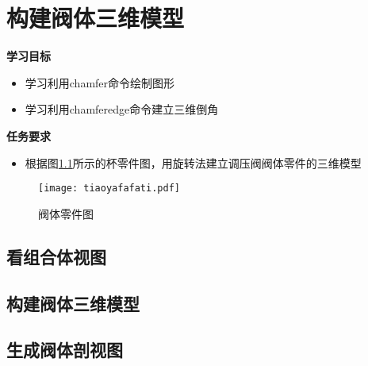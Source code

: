 \chapter{构建阀体三维模型}

{\bfseries 学习目标}
\begin{itemize}
\item 学习利用chamfer命令绘制图形
\item 学习利用chamferedge命令建立三维倒角
\end{itemize}

{\bfseries 任务要求}
\begin{itemize}
\item 根据图\ref{fig:tiaoyafafati}所示的杯零件图，用旋转法建立调压阀阀体零件的三维模型
\end{itemize}

\noindent
\begin{figure}[htbp]
\centering
\texttt{[image: tiaoyafafati.pdf]}
\caption{阀体零件图}\label{fig:tiaoyafafati}
\end{figure}
\clearpage
\section{看组合体视图}


%
\section{构建阀体三维模型}


\section{生成阀体剖视图}


\endinput